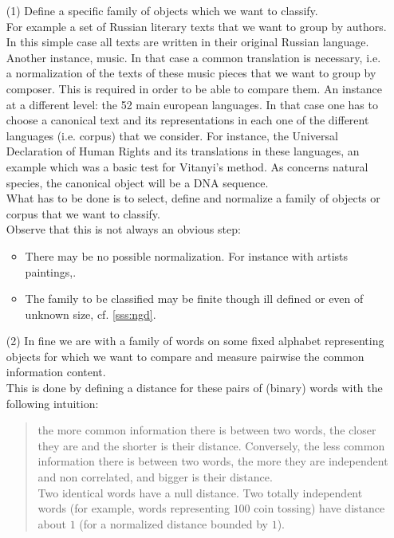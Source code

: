 \begin{enumerate}
\item[(1)]
Define a specific family of objects which we want to classify.
\\
For example a set of Russian literary texts that we want to
group by authors. In this simple case all texts are written
in their original Russian language.
Another instance, music. In that case a common translation is
necessary, i.e. a normalization of the texts of these music pieces
that we want to group by composer. This is required
in order to be able to compare them.
An instance at a different level: the 52 main european languages.
In that case one has to choose a canonical text and its
representations in each one of the different languages
(i.e. corpus) that we consider.
For instance, the Universal Declaration of Human Rights
and its translations in these languages,
an example which was a basic test for Vitanyi's method.
As concerns natural species, the canonical object will be a
DNA sequence.
\\
What has to be done is to select, define and normalize a family
of objects or corpus that we want to classify.
\\
Observe that this is not always an obvious step:
    \begin{itemize}
    \item
    There may be no possible normalization. For instance with
    artists paintings,.
    \item
    The family to be classified may be finite though ill defined
    or even of unknown size, cf. \ref{sss:ngd}.
    \end{itemize}
\item[(2)]
In fine we are with a family of words on some fixed alphabet
representing objects for which we want to compare and measure
pairwise the common information content.
\\
This is done by defining a distance for these pairs
of (binary) words with the following intuition:
\begin{quote}
the more common information there is between two words,
the closer they are and the shorter is their distance.
Conversely, the less common information there is between two words,
the more they are independent and non correlated,
and bigger is their distance.
\\
Two identical words have a null distance.
Two totally independent words
(for example, words representing $100$ coin tossing)
have distance about $1$ (for a normalized distance bounded by $1$).
\end{quote}

\end{enumerate}
